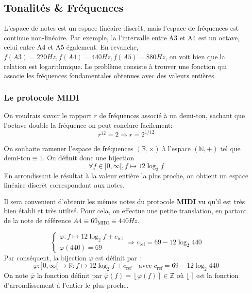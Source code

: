 \documentclass[french,]{article}
\begin{document}
\hypertarget{tonalites-frequences}{%
\subsection{Tonalités \& Fréquences}\label{tonalites-frequences}}

L'espace de notes est un espace linéaire discrèt, mais l'espace de
fréquences est continue non-linéaire. Par exemple, la l'intervalle entre
A3 et A4 est un octave, celui entre A4 et A5 également. En revanche,
\(f(A3)=220Hz, f(A4)=440Hz, f(A5)=880Hz\), on voit bien que la relation
est logarithmique. Le problème consiste à trouver une fonction qui
associe les fréquences fondamentales obtenues avec des valeurs entières.

\hypertarget{le-protocole-midi}{%
\subsubsection{Le protocole MIDI}\label{le-protocole-midi}}

On voudrais savoir le rapport \(r\) de fréquences associé à un demi-ton,
sachant que l'octave double la fréquence on peut conclure facilement:
\[ r^{12} = 2 \Rightarrow r=2^{1/12} \]

On souhaite ramener l'espace de fréquences \((\mathbb{R},\times)\) à
l'espace \((\mathbb{N},+)\) tel que \(\boxed{\text{demi-ton}\equiv 1}\).
On définit donc une bijection
\[\forall f\in]0,\infty[, f\mapsto 12 \log_2 f \] En arrondissant le
résultat à la valeur entière la plus proche, on obtient un espace
linéaire discrèt correspondant aux notes.

Il sera convenient d'obtenir les mêmes notes du protocole \textbf{MIDI}
vu qu'il est très bien établi et très utilisé. Pour cela, on effectue
une petite translation, en partant de la note de référence
\(A4\equiv 69_{\text{MIDI}} \equiv 440Hz\).

\[\begin{cases}
\varphi:f\mapsto 12\log_2 f + c_{\text{ref}}\\
\varphi(440) = 69
\end{cases}\Rightarrow c_{\text{ref}} = 69 - 12\log_2 440\] Par
conséquent, la bijection \(\varphi\) est définit par :
\[\varphi: ]0,\infty[ \rightarrow \mathbb{R} : f \mapsto 12\log_2 f + c_{\text{ref}}
\quad\text{avec } c_{\text{ref}}=69 - 12\log_2 440\] On note
\(\bar{\varphi}\) la fonction définit par
\(\bar{\varphi}(f)=\left\lfloor\varphi(f)\right\rceil\in\mathbb{Z}\) où
\(\lfloor\cdot\rceil\) est la fonction d'arrondissement à l'entier le
plus proche.
\end{document}
